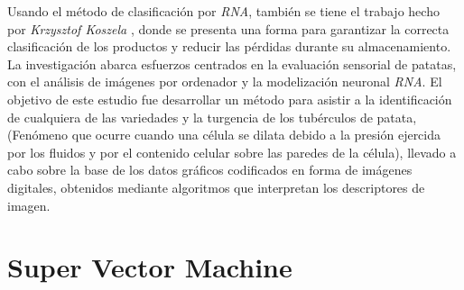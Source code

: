 Usando el método de clasificación por \textit{RNA}, también se tiene el trabajo hecho por \textit{Krzysztof Koszela} \cite{Przybyl2019}, donde se presenta una forma para garantizar la correcta clasificación de los productos y reducir las pérdidas durante su almacenamiento. La investigación abarca esfuerzos centrados en la evaluación sensorial de patatas, con el análisis de imágenes por ordenador y la modelización neuronal \textit{RNA}. El objetivo de este estudio fue desarrollar un método para asistir a la identificación de cualquiera de las variedades y la turgencia de los tubérculos de patata, (Fenómeno que ocurre cuando una célula se dilata debido a la presión ejercida por los fluidos y por el contenido celular sobre las paredes de la célula), llevado a cabo sobre la base de los datos gráficos codificados en forma de imágenes digitales, obtenidos mediante algoritmos que interpretan los descriptores de imagen.\\

\section{Super Vector Machine}

